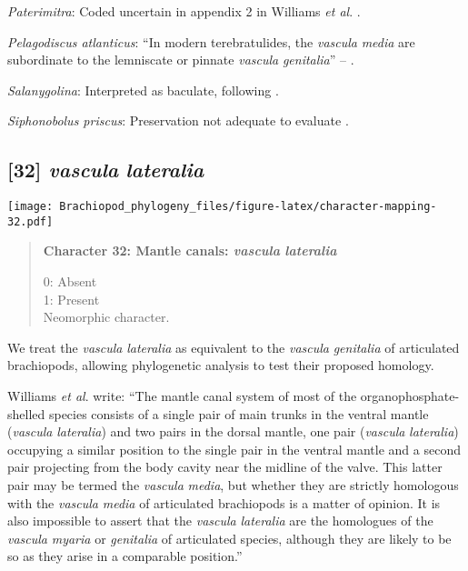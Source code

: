\documentclass[openany]{book}
\theoremstyle{definition}
\theoremstyle{definition}
\theoremstyle{definition}
\theoremstyle{remark}
\begin{document}
\hypertarget{Paterimitra-coding-31}{}
\emph{Paterimitra}: Coded uncertain in appendix 2 in Williams \emph{et
al}. \citeyearpar{Williams1998Thediversity}.

\hypertarget{Pelagodiscus_atlanticus-coding-31}{}
\emph{Pelagodiscus atlanticus}: ``In modern terebratulides, the
\emph{vascula} \emph{media} are subordinate to the lemniscate or pinnate
\emph{vascula} \emph{genitalia}'' -- \citet{Williams1997Introduction}.

\hypertarget{Salanygolina-coding-31}{}
\emph{Salanygolina}: Interpreted as baculate, following
\citet{Havlicek1982LingulaceaPaterinacea}.

\hypertarget{Siphonobolus_priscus-coding-31}{}
\emph{Siphonobolus priscus}: Preservation not adequate to evaluate
\citep{Streng2016Anew}.

\subsection*{\texorpdfstring{{[}32{]} \emph{vascula}
\emph{lateralia}}{{[}32{]} vascula lateralia}}\label{vascula-lateralia}

\texttt{[image: Brachiopod\_phylogeny\_files/figure-latex/character-mapping-32.pdf]}

\begin{quote}
\textbf{Character 32: Mantle canals: \emph{vascula} \emph{lateralia}}

0: Absent\\
1: Present\\
Neomorphic character.
\end{quote}

We treat the \emph{vascula} \emph{lateralia} as equivalent to the
\emph{vascula} \emph{genitalia} of articulated brachiopods, allowing
phylogenetic analysis to test their proposed homology.

Williams \emph{et al}. \citeyearpar{Williams1997Introduction} write:
``The mantle canal system of most of the organophosphate-shelled species
consists of a single pair of main trunks in the ventral mantle
(\emph{vascula} \emph{lateralia}) and two pairs in the dorsal mantle,
one pair (\emph{vascula} \emph{lateralia}) occupying a similar position
to the single pair in the ventral mantle and a second pair projecting
from the body cavity near the midline of the valve. This latter pair may
be termed the \emph{vascula} \emph{media}, but whether they are strictly
homologous with the \emph{vascula} \emph{media} of articulated
brachiopods is a matter of opinion. It is also impossible to assert that
the \emph{vascula} \emph{lateralia} are the homologues of the
\emph{vascula} \emph{myaria} or \emph{genitalia} of articulated species,
although they are likely to be so as they arise in a comparable
position.''
\end{document}
